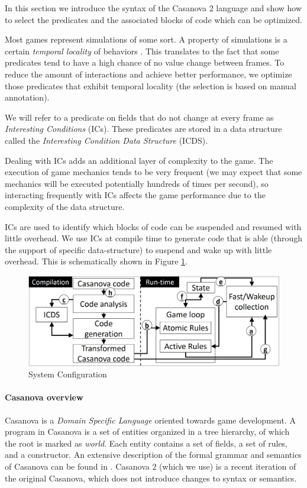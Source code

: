 In this section we introduce the syntax of the Casanova 2 language and show how to select the predicates and the associated blocks of code which can be optimized.

Most games represent simulations of some sort. A property of simulations is a certain \textit{temporal locality} of behaviors \cite{ai_dithering}. This translates to the fact that some predicates tend to have a high chance of no value change between frames. To reduce the amount of interactions and achieve better performance, we optimize those predicates that exhibit temporal locality (the selection is based on manual annotation).

We will refer to a predicate on fields that do not change at every frame as \textit{Interesting Conditions} (ICs). These predicates are stored in a data structure called the \textit{Interesting Condition Data Structure} (ICDS).

Dealing with ICs adds an additional layer of complexity to the game. The execution of game mechanics tends to be very frequent (we may expect that some mechanics will be executed potentially hundreds of times per second), so interacting frequently with ICs affects the game performance due to the complexity of the data structure.

ICs are used to identify which blocks of code can be suspended and resumed with little overhead. We use ICs at compile time to generate code that is able (through the support of specific data-structure) to suspend and wake up with little overhead. This is schematically shown in Figure \ref{fig:system_configuration}.

\vspace{-11pt}
\begin{figure}[!h]
		\centering
         \includegraphics[scale=0.18]{Figures/system_description.jpg}
         \caption{System Configuration}
         \label{fig:system_configuration}
\end{figure}
\vspace{-10pt}


\paragraph*{Casanova overview}
Casanova is a \textit{Domain Specific Language} oriented towards game development. A program in Casanova is a set of entities organized in a tree hierarchy, of which the root is marked as \textit{world}. Each entity contains a set of fields, a set of rules, and a constructor. An extensive description of the formal grammar and semantics of Casanova can be found in \cite{maggiore2013casanova}. Casanova 2 (which we use) is a recent iteration of the original Casanova, which does not introduce changes to syntax or semantics.

